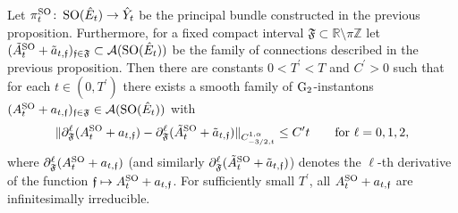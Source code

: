 \documentclass[11pt,a4paper]{scrartcl}
\newcommand{\col}{\colon \thinspace}
\newcommand{\VertWHt}[3]{\Vert_{C^{{#1},\alpha}_{{#2},t}{#3}}}
\newcommand{\G}{\textup{G}}
\newcommand{\SO}{\textup{SO}}
\numberwithin{equation}{section}
\theoremstyle{plain}
\theoremstyle{definition}
\theoremstyle{remark}
\begin{document}
\begin{proposition}\label{prop:example18-existence-instantons}
Let $\pi_t^{\SO} \col \SO(\hat{E}_t) \to \hat{Y}_t$ be the principal bundle constructed in the previous proposition. Furthermore, for a fixed compact interval $\mathfrak{F}\subset \mathbb{R}\setminus \pi \mathbb{Z}$ let $(\tilde{A}_{t}^{\SO} + \tilde{a}_{t,\mathfrak{f}})_{\mathfrak{f}\in \mathfrak{F}} \subset \mathcal{A}(\SO(\hat{E}_{t}))$ be the family of connections described in the previous proposition. Then there are constants $0<T^\prime<T$ and $C^\prime>0$ such that for each $t\in (0,T^\prime)$ there exists a smooth family of $\G_2$-instantons $(A_{t}^\SO + a_{t,\mathfrak{f}})_{\mathfrak{f}\in \mathfrak{F}} \in \mathcal{A}(\SO(\hat{E}_{t}))$ with 
\begin{align}\label{eq:example18-estiamtes-on-perturbed-instantons}
\Vert \partial_\mathfrak{F}^\ell (A_{t}^\SO + a_{t,\mathfrak{f}}) - \partial_\mathfrak{F}^{\ell}(\tilde{A}_{t}^{\SO} + \tilde{a}_{t,\mathfrak{f}}) \VertWHt{1}{-3/2}{} \leq C^\prime t \qquad \textup{for $\ell =0,1,2$},
\end{align} 
where $\partial_\mathfrak{F}^{\ell}(A_{t}^{\SO} + a_{t,\mathfrak{f}})$ (and similarly $\partial_\mathfrak{F}^\ell (\tilde{A}_{t}^\SO + \tilde{a}_{t,\mathfrak{f}})$) denotes the $\ell$-th derivative of the function $\mathfrak{f}\mapsto A_{t}^{\SO} + a_{t,\mathfrak{f}}$. For sufficiently small $T^\prime$, all $A^{\SO}_t+a_{t,\mathfrak{f}}$ are infinitesimally irreducible.
\end{proposition}
\end{document}
